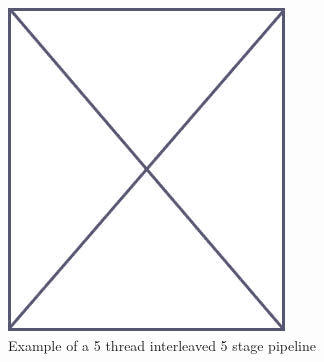 \begin{figure}
\begin{center}
\includegraphics[scale=.4]{figs/placeholder}
\end{center}
\caption{Example of a 5 thread interleaved 5 stage pipeline}
\label{fig:execution_thread_interleaved_pipeline}
\end{figure}

